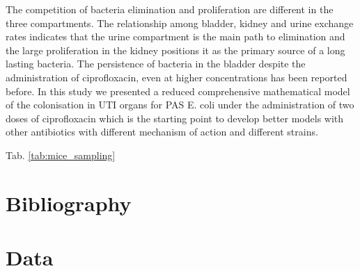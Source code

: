 \documentclass{article}
\begin{document}
The competition of bacteria elimination and proliferation are different in the three compartments.
The relationship among bladder, kidney and urine exchange rates indicates that the urine compartment is the main path to elimination and the large proliferation in the kidney positions it as the primary source of a long lasting bacteria. The persistence of bacteria in the bladder despite the administration of ciprofloxacin, even at higher concentrations has been reported before.\cite{jakobsen2020ciprofloxacin} In this study we presented a reduced comprehensive mathematical model of the colonisation in UTI organs for PAS E. coli under the administration of two doses of ciprofloxacin which is the starting point to develop better models with other antibiotics with different mechanism of action and different strains.

Tab. \ref{tab:mice_sampling}

\section{Bibliography}

\appendix
\section{Data}

\end{document}
